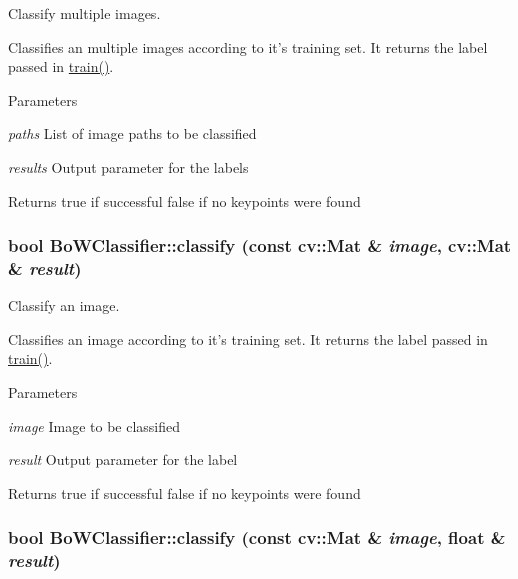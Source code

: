 Classify multiple images. 

Classifies an multiple images according to it's training set. It returns the label passed in \hyperlink{classBoWClassifier_a895b3766f5600533aa08632e42653dcb}{train()}.


\begin{DoxyParams}{Parameters}
\item[{\em paths}]List of image paths to be classified \item[{\em results}]Output parameter for the labels \end{DoxyParams}
\begin{DoxyReturn}{Returns}
true if successful false if no keypoints were found 
\end{DoxyReturn}
\hypertarget{classBoWClassifier_abb49e025e2e683e28ebaf38d3ddb34df}{
\subsubsection[{classify}]{\setlength{\rightskip}{0pt plus 5cm}bool BoWClassifier::classify (const cv::Mat \& {\em image}, \/  cv::Mat \& {\em result})}}
\label{classBoWClassifier_abb49e025e2e683e28ebaf38d3ddb34df}


Classify an image. 

Classifies an image according to it's training set. It returns the label passed in \hyperlink{classBoWClassifier_a895b3766f5600533aa08632e42653dcb}{train()}.


\begin{DoxyParams}{Parameters}
\item[{\em image}]Image to be classified \item[{\em result}]Output parameter for the label \end{DoxyParams}
\begin{DoxyReturn}{Returns}
true if successful false if no keypoints were found 
\end{DoxyReturn}
\hypertarget{classBoWClassifier_afd7819ef860dc5f9ee45790456885262}{
\subsubsection[{classify}]{\setlength{\rightskip}{0pt plus 5cm}bool BoWClassifier::classify (const cv::Mat \& {\em image}, \/  float \& {\em result})}}
\label{classBoWClassifier_afd7819ef860dc5f9ee45790456885262}


